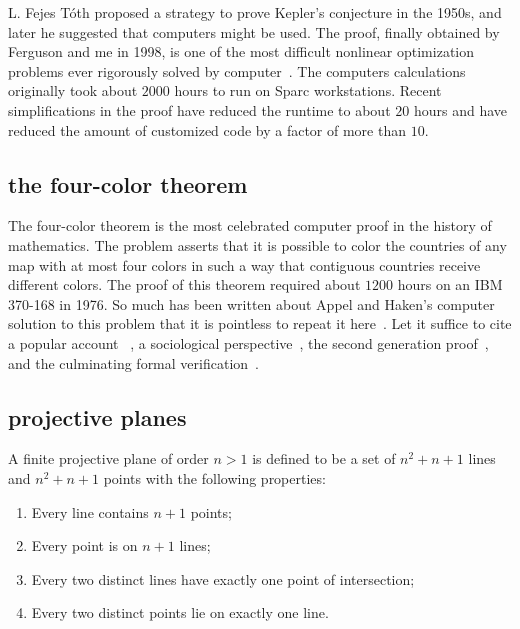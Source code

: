 \documentclass{llncs}
\begin{document}
L. Fejes T\'oth proposed a strategy to prove Kepler's conjecture in
the 1950s, and later he suggested that computers might be used.  The
proof, finally obtained by Ferguson and me in 1998, is one of the
most difficult nonlinear optimization problems ever rigorously solved
by computer~\cite{Hales:2005:Annals}.  The computers calculations
originally took about $2000$ hours to run on Sparc workstations.
Recent simplifications in the proof have reduced the runtime to about
$20$ hours and have reduced the amount of customized code by a factor
of more than $10$.


\subsection{the four-color theorem}

The four-color theorem is the most celebrated computer proof in the
history of mathematics.  The problem asserts that it is possible to
color the countries of any map with at most four colors in such a way
that contiguous countries receive different colors.  The proof of this
theorem required about $1200$ hours on an IBM 370-168 in 1976. So much
has been written about Appel and Haken's computer solution to this
problem that it is pointless to repeat it here~\cite{AH4CT}.  Let it
suffice to cite a popular account ~\cite{Wil4CT}, a sociological
perspective~\cite{Mac}, the second generation
proof~\cite{Robertson:1997:JCTB}, and the culminating formal
verification~\cite{gonthier:2008:formal}.

\subsection{projective planes}

A finite projective plane of order $n>1$ is defined to be a set of
$n^2 + n + 1$ lines and $n^2 + n+ 1$ points with the following
properties:
\begin{enumerate}
\item Every line contains $n+1$ points;
\item Every point is on $n+1$ lines;
\item Every two distinct lines have exactly one point of intersection;
\item Every two distinct points lie on exactly one line.
\end{enumerate}
\end{document}
